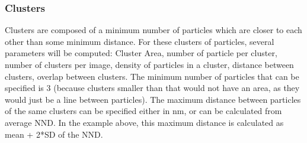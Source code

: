 \documentclass[12pt, a4paper]{scrartcl}
\begin{document}
\subsubsection{Clusters}
\label{m:clusters}
Clusters are composed of a minimum number of particles which are closer to each other than some minimum distance. For these clusters of particles, several parameters will be computed: Cluster Area, number of particle per cluster, number of clusters per image, density of particles in a cluster, distance between clusters, overlap between clusters. The minimum number of particles that can be specified is 3 (because clusters smaller than that would not have an area, as they would just be a line between particles). The maximum distance between particles of the same clusters can be specified either in nm, or can be calculated from average NND. In the example above, this maximum distance is calculated as mean + 2*SD of the NND.
\end{document}

